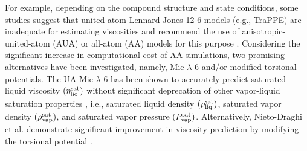 \documentclass[preprint,review,12pt]{elsarticle}
\begin{document}
	For example, depending on the compound structure and state conditions, some studies suggest that united-atom Lennard-Jones 12-6 models (e.g., TraPPE) are inadequate for estimating viscosities and recommend the use of anisotropic-united-atom (AUA) or all-atom (AA) models for this purpose \cite{Allen1997,Payal2012,Mondello1997,Ungerer2007}. Considering the significant increase in computational cost of AA simulations, two promising alternatives have been investigated, namely, Mie $\lambda$-6 and/or modified torsional potentials. The UA Mie $\lambda$-6 has been shown to accurately predict saturated liquid viscosity $(\eta_{\rm liq}^{\rm sat})$ without significant deprecation of other vapor-liquid saturation properties \cite{Gordon2006}, i.e., saturated liquid density $(\rho_{\rm liq}^{\rm sat})$, saturated vapor density $(\rho_{\rm vap}^{\rm sat})$, and saturated vapor pressure $(P_{\rm vap}^{\rm sat})$. Alternatively, Nieto-Draghi et al. demonstrate significant improvement in viscosity prediction by modifying the torsional potential \cite{Nieto2006}.  
	
	
	
	
\end{document}
